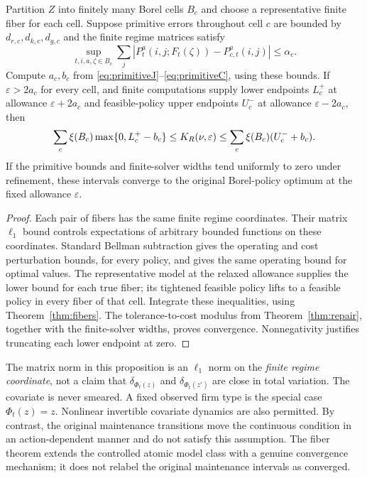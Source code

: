 \begin{proposition}\label{prop:fiber-cells}
Partition $Z$ into finitely many Borel cells $B_c$ and choose a representative finite fiber for each cell. Suppose primitive errors throughout cell $c$ are bounded by $d_{r,c},d_{k,c},d_{g,c}$ and the finite regime matrices satisfy
\[
 \sup_{t,i,a,\zeta\in B_c}\sum_j
 |P_t^a(i,j;F_t(\zeta))-P^a_{c,t}(i,j)|\leq\alpha_c.
\]
Compute $a_c,b_c$ from \eqref{eq:primitiveJ}--\eqref{eq:primitiveC}, using these bounds. If $\varepsilon>2a_c$ for every cell, and finite computations supply lower endpoints $L_c^+$ at allowance $\varepsilon+2a_c$ and feasible-policy upper endpoints $U_c^-$ at allowance $\varepsilon-2a_c$, then
\begin{equation}\label{eq:fiber-cells}
 \sum_c\xi(B_c)\max\{0,L_c^+-b_c\}
 \leq K_R(\nu,\varepsilon)
 \leq\sum_c\xi(B_c)(U_c^-+b_c).
\end{equation}
If the primitive bounds and finite-solver widths tend uniformly to zero under refinement, these intervals converge to the original Borel-policy optimum at the fixed allowance $\varepsilon$.
\end{proposition}
\begin{proof}
Each pair of fibers has the same finite regime coordinates. Their matrix $\ell_1$ bound controls expectations of arbitrary bounded functions on these coordinates. Standard Bellman subtraction gives the operating and cost perturbation bounds, for every policy, and gives the same operating bound for optimal values. The representative model at the relaxed allowance supplies the lower bound for each true fiber; its tightened feasible policy lifts to a feasible policy in every fiber of that cell. Integrate these inequalities, using Theorem~\ref{thm:fibers}. The tolerance-to-cost modulus from Theorem~\ref{thm:repair}, together with the finite-solver widths, proves convergence. Nonnegativity justifies truncating each lower endpoint at zero.
\end{proof}

The matrix norm in this proposition is an $\ell_1$ norm on the \emph{finite regime coordinate}, not a claim that $\delta_{\Phi_t(z)}$ and $\delta_{\Phi_t(z')}$ are close in total variation. The covariate is never smeared. A fixed observed firm type is the special case $\Phi_t(z)=z$. Nonlinear invertible covariate dynamics are also permitted. By contrast, the original maintenance transitions move the continuous condition in an action-dependent manner and do not satisfy this assumption. The fiber theorem extends the controlled atomic model class with a genuine convergence mechanism; it does not relabel the original maintenance intervals as converged.
